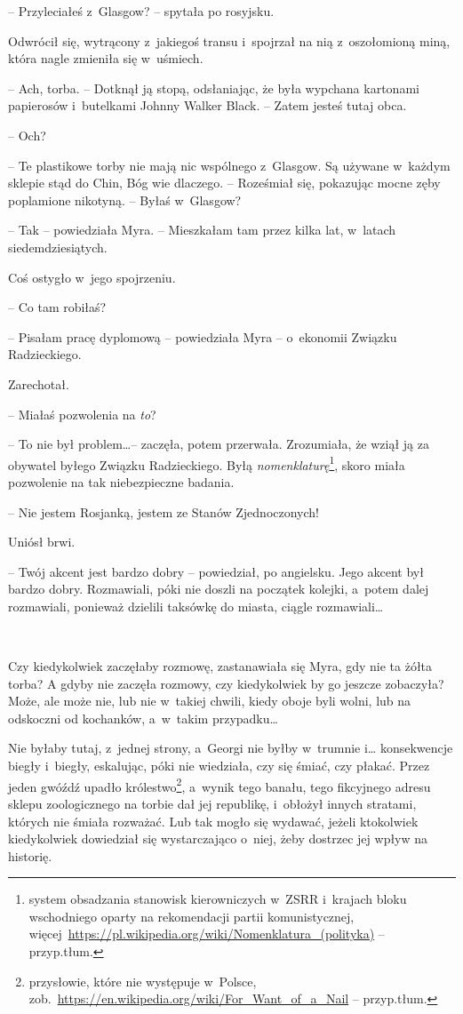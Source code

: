 \documentclass[oneside,polish,11pt,sfheadings]{mwbk}
\begin{document}
-- Przyleciałeś z~Glasgow? -- spytała po rosyjsku.

Odwrócił się, wytrącony z~jakiegoś transu i~spojrzał na nią z~oszołomioną miną, która nagle zmieniła się w~uśmiech.

-- Ach, torba. -- Dotknął ją stopą, odsłaniając, że była wypchana
kartonami papierosów i~butelkami Johnny Walker Black. -- Zatem jesteś
tutaj obca.

-- Och?

-- Te plastikowe torby nie mają nic wspólnego z~Glasgow. Są używane w~każdym sklepie stąd do Chin, Bóg wie dlaczego. -- Roześmiał się,
pokazując mocne zęby poplamione nikotyną. -- Byłaś w~Glasgow?

-- Tak -- powiedziała Myra. -- Mieszkałam tam przez kilka lat, w~latach
siedemdziesiątych.

Coś ostygło w~jego spojrzeniu. 

-- Co tam robiłaś?

-- Pisałam pracę dyplomową -- powiedziała Myra -- o~ekonomii Związku
Radzieckiego.

Zarechotał. 

-- Miałaś pozwolenia na \textit{to}?

-- To nie był problem\ldots -- zaczęła, potem przerwała. Zrozumiała, że wziął
ją za obywatel byłego Związku Radzieckiego. Byłą \textit{nomenklaturę}\footnote{
system obsadzania stanowisk kierowniczych w~ZSRR i~krajach bloku
wschodniego oparty na rekomendacji partii komunistycznej,
więcej~\url{https://pl.wikipedia.org/wiki/Nomenklatura\_(polityka)}
-- przyp.tłum.}, skoro miała pozwolenie na tak niebezpieczne badania.

-- Nie jestem Rosjanką, jestem ze Stanów Zjednoczonych!

Uniósł brwi.

-- Twój akcent jest bardzo dobry -- powiedział, po angielsku. Jego akcent
był bardzo dobry. Rozmawiali, póki nie doszli na początek kolejki, a~potem dalej rozmawiali, ponieważ dzielili taksówkę do miasta, ciągle
rozmawiali\ldots

~

Czy kiedykolwiek zaczęłaby rozmowę, zastanawiała się Myra, gdy nie ta
żółta torba? A gdyby nie zaczęła rozmowy, czy kiedykolwiek by go jeszcze
zobaczyła? Może, ale może nie, lub nie w~takiej chwili, kiedy oboje byli
wolni, lub na odskoczni od kochanków, a~w~takim przypadku\ldots

Nie byłaby tutaj, z~jednej strony, a~Georgi nie byłby w~trumnie i\ldots
konsekwencje biegły i~biegły, eskalując, póki nie wiedziała, czy się
śmiać, czy płakać. Przez jeden gwóźdź upadło królestwo\footnote{ przysłowie,
które nie występuje w~Polsce,
zob.~\url{https://en.wikipedia.org/wiki/For\_Want\_of\_a\_Nail}
-- przyp.tłum.}, a~wynik tego banału, tego fikcyjnego adresu sklepu
zoologicznego na torbie dał jej republikę, i~obłożył innych stratami,
których nie śmiała rozważać. Lub tak mogło się wydawać, jeżeli
ktokolwiek kiedykolwiek dowiedział się wystarczająco o~niej, żeby
dostrzec jej wpływ na historię.
\end{document}
